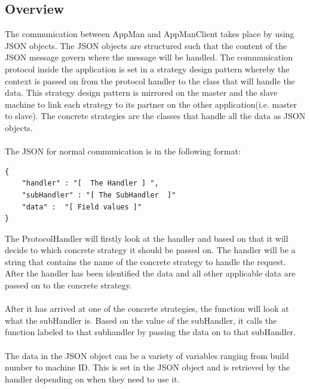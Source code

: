 \documentclass[a4paper,12pt,final]{article}
\begin{document}
\subsection{Overview}
The communication between AppMan and AppManClient takes place 
by using JSON objects. The JSON objects are structured such that the 
content of the JSON message govern where the message will be handled. 
The communication protocol inside the application is set in a strategy design pattern
whereby the context is passed on from the protocol handler to the class that will 
handle the data. This strategy design pattern is mirrored on the master and the slave
machine to link each strategy to its partner on the other application(i.e. master to slave).
The concrete strategies are the classes that handle all the data as JSON objects.\\
\textbf{\\}
The JSON for normal communication is in the following format:
\begin{verbatim}
{
	"handler" : "[  The Handler ] ",
	"subHandler" : "[ The SubHandler  ]"
	"data" :  "[ Field values ]"
}
\end{verbatim}
The ProtocolHandler will firstly look at the handler and based on that it will decide to
which concrete strategy it should be passed on. The handler will be a string that contains
the name of the concrete strategy to handle the request. After the handler has been 
identified the data and all other applicable data are passed on to the concrete strategy.\\
\textbf{\\}
After it has arrived at one of the concrete strategies, the function will look at what
the subHandler is. Based on the value of the subHandler, it calls the function labeled
to that subhandler by passing the data on to that subHandler.\\
\textbf{\\}
The data in the JSON object can be a variety of variables ranging from build number
to machine ID. This is set in the JSON object and is retrieved by the handler depending
on when they need to use it.\\
\textbf{\\}
\end{document}
